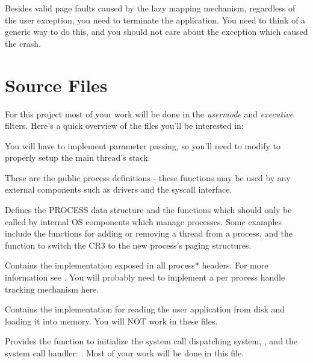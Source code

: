 Besides valid page faults caused by the lazy mapping mechanism, regardless of the user exception, you
need to terminate the application. You need to think of a generic way to do this, and you should not
care about the exception which caused the crash.

\section{Source Files}

For this project most of your work will be done in the \textit{usermode} and \textit{executive}
filters. Here's a quick overview of the files you'll be interested in:


You will have to implement parameter passing, so you'll need to modify 
 to properly setup the main thread's stack.



These are the public process definitions - these functions may be used by any external components
such as drivers and the syscall interface.


Defines the PROCESS data structure and the functions which should only be called by internal OS
components which manage processes. Some examples include the functions for adding or removing a
thread from a process, and the function to switch the CR3 to the new process’s paging structures.


Contains the implementation exposed in all process* headers. For more information see
. You will probably need to implement a per process handle tracking
mechanism here.



Contains the implementation for reading the user application from disk and loading it into memory.
You will NOT work in these files.



Provides the function to initialize the system call dispatching system, , and
the system call handler: . Most of your work will be done in this file.

